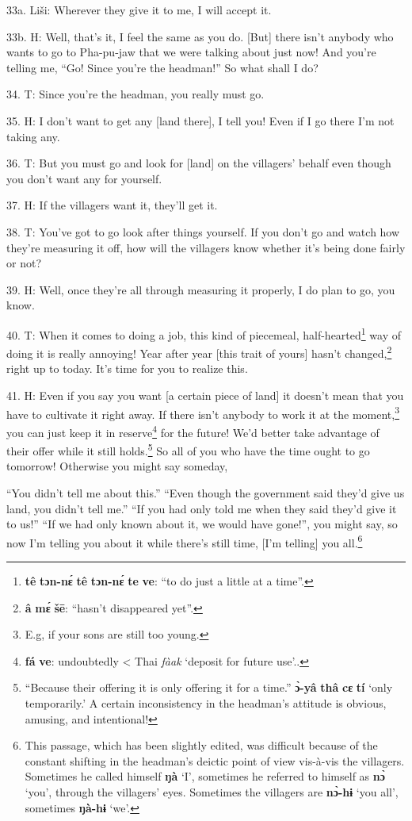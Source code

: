 33a. Liši: Wherever they give it to me, I will accept it.

33b. H: Well, that's it, I feel the same as you do. [But] there isn't anybody who
wants to go to Pha-pu-jaw that we were talking about just now! And you're telling
me, ``Go! Since you're the headman!'' So what shall I do?

34. T: Since you're the headman, you really must go.

35. H: I don't want to get any [land there], I tell you! Even if I go there I'm
not taking any.

36. T: But you must go and look for [land] on the villagers' behalf even though
you don't want any for yourself.

37. H: If the villagers want it, they'll get it.

38. T: You've got to go look after things yourself. If you don't go and watch
how they're measuring it off, how will the villagers know whether it's being done
fairly or not?

39. H: Well, once they're all through measuring it properly, I do plan to go, you
know.

40. T: When it comes to doing a job, this kind of piecemeal, half-hearted\footnote{\textbf{tê} \textbf{tɔn-nɛ́} \textbf{tê} \textbf{tɔn-nɛ́} \textbf{te} \textbf{ve}: ``to do just a little at a time''.}
way of doing it is really annoying! Year after year [this trait of yours] hasn't
changed,\footnote{\textbf{â} \textbf{mɛ́} \textbf{šē}: ``hasn't disappeared yet''.} right up to today. It's time for you to realize this.

41. H: Even if you say you want [a certain piece of land] it doesn't mean that you
have to cultivate it right away. If there isn't anybody to work it at the moment,\footnote{E.g, if your sons are still too young.}
you can just keep it in reserve\footnote{\textbf{fá} \textbf{ve}: undoubtedly < Thai \textit{fàak} `deposit for future use'..} for the future! We'd better take advantage
of their offer while it still holds.\footnote{``Because their offering it is only offering it for a time.'' \textbf{ɔ̀-yâ} \textbf{thâ} \textbf{cɛ} \textbf{tí} `only temporarily.' A certain inconsistency in the headman's attitude is obvious, amusing, and intentional!} So all of you who have the time ought
to go tomorrow! Otherwise you might say someday,

``You didn't tell me about this.'' ``Even though the government said they'd give
us land, you didn't tell me.'' ``If you had only told me when they said they'd
give it to us!'' ``If we had only known about it, we would have gone!'', you might
say, so now I'm telling you about it while there's still time, [I'm telling] you
all.\footnote{This passage, which has been slightly edited, was difficult because of the constant shifting in the headman's deictic point of view vis-à-vis the villagers. Sometimes he called himself \textbf{ŋà} `I', sometimes he referred to himself as \textbf{nɔ̀} `you', through the villagers' eyes. Sometimes the villagers are \textbf{nɔ̀-hɨ} `you all', sometimes \textbf{ŋà-hɨ} `we'.}

